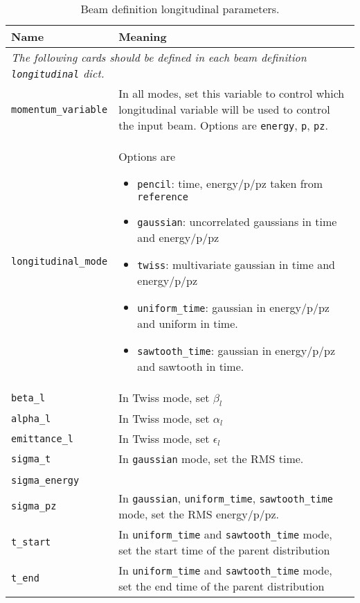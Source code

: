 \begin{table*}
\begin{center}
\caption{Beam definition longitudinal parameters.}
\begin{tabularx}{\linewidth}{lX}
Name & Meaning \\
\hline
\multicolumn{2}{l}{\emph{The following cards should be defined in each beam definition \verb|longitudinal| dict.}} \\
\hline
\verb|momentum_variable| & In all modes, set this variable to control which longitudinal variable will be used to control the input beam. Options are \verb|energy|, \verb|p|, \verb|pz|. \\
\verb|longitudinal_mode| & Options are
                          \begin{itemize}
                            \setlength{\itemsep}{0mm}
                            \item \verb|pencil|: time, energy/p/pz taken from \verb|reference|
                            \item \verb|gaussian|: uncorrelated gaussians in time and energy/p/pz
                            \item \verb|twiss|: multivariate gaussian in time and energy/p/pz
                            \item \verb|uniform_time|: gaussian in energy/p/pz and uniform in time.
                            \item \verb|sawtooth_time|: gaussian in energy/p/pz and sawtooth in time.
                          \end{itemize} \\
\hline
\verb|beta_l| & In Twiss mode, set $\beta_l$\\
\verb|alpha_l| & In Twiss mode, set $\alpha_l$\\
\verb|emittance_l| & In Twiss mode, set $\epsilon_l$\\
\hline
\verb|sigma_t| & In \verb|gaussian| mode, set the RMS time. \\
\begin{tabular}{l} \verb|sigma_p| \\ \verb|sigma_energy| \\ \verb|sigma_pz| \end{tabular} & In \verb|gaussian|, \verb|uniform_time|, \verb|sawtooth_time| mode, set the RMS energy/p/pz. \\
\hline
\verb|t_start| & In \verb|uniform_time| and \verb|sawtooth_time| mode, set the start time of the parent distribution \\
\verb|t_end| & In \verb|uniform_time| and \verb|sawtooth_time| mode, set the end time of the parent distribution \\
\end{tabularx}
\end{center}
\end{table*}

